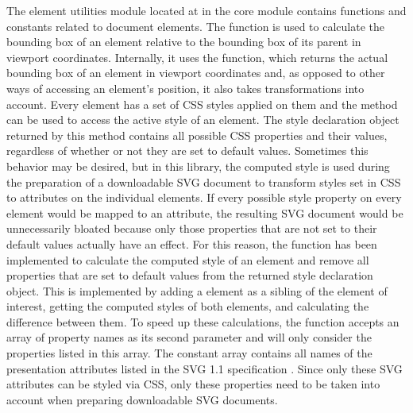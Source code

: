The element utilities module located at  in the core module contains functions and constants related to document elements.
The  function is used to calculate the bounding box of an element relative to the bounding box of its parent in viewport coordinates.
Internally, it uses the  function, which returns the actual bounding box of an element in viewport coordinates and, as opposed to other ways of accessing an element's position, it also takes transformations into account.
Every element has a set of CSS styles applied on them and the  method can be used to access the active style of an element.
The style declaration object returned by this method contains all possible CSS properties and their values, regardless of whether or not they are set to default values.
Sometimes this behavior may be desired, but in this library, the computed style is used during the preparation of a downloadable SVG document to transform styles set in CSS to attributes on the individual elements.
If every possible style property on every element would be mapped to an attribute, the resulting SVG document would be unnecessarily bloated because only those properties that are not set to their default values actually have an effect.
For this reason, the  function has been implemented to calculate the computed style of an element and remove all properties that are set to default values from the returned style declaration object.
This is implemented by adding a  element as a sibling of the element of interest, getting the computed styles of both elements, and calculating the difference between them.
To speed up these calculations, the  function accepts an array of property names as its second parameter and will only consider the properties listed in this array.
The constant  array contains all names of the presentation attributes listed in the SVG 1.1 specification \parencite{SVG11}.
Since only these SVG attributes can be styled via CSS, only these properties need to be taken into account when preparing downloadable SVG documents.


